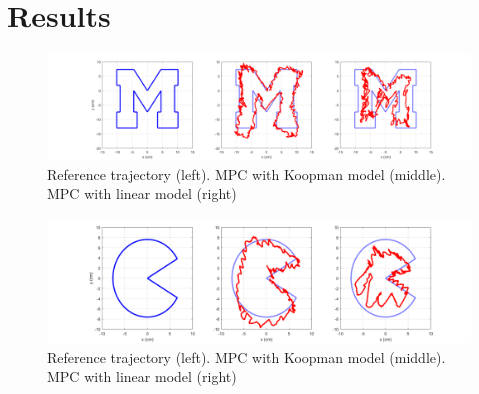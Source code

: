 \section{Results}
\label{sec:results}

\begin{figure}
    \centering
    \includegraphics[width=\linewidth]{figures/compare_blockM_300s_draft.png}
    \caption{Reference trajectory (left). MPC with Koopman model (middle). MPC with linear model (right)}
    \label{fig:compare_blockM}
\end{figure}

\begin{figure}
    \centering
    \includegraphics[width=\linewidth]{figures/compare_pacman68_90s_draft.png}
    \caption{Reference trajectory (left). MPC with Koopman model (middle). MPC with linear model (right)}
    \label{fig:compare_pacman}
\end{figure}

